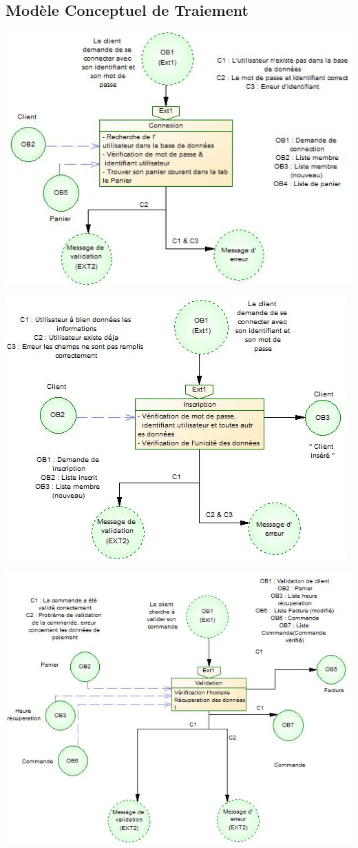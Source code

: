 \documentclass[12pt]{report}
\begin{document}
\begin{spacing}{1.2}
\chapter{Modèle Conceptuel de Traiement}
\newpage
\centerline{\includegraphics{mct_connexion.jpg}}
\centerline{\includegraphics{mct_inscription.jpg}}
\centerline{\includegraphics{mct_validationCommande.jpg}}

\end{spacing}
\end{document}
